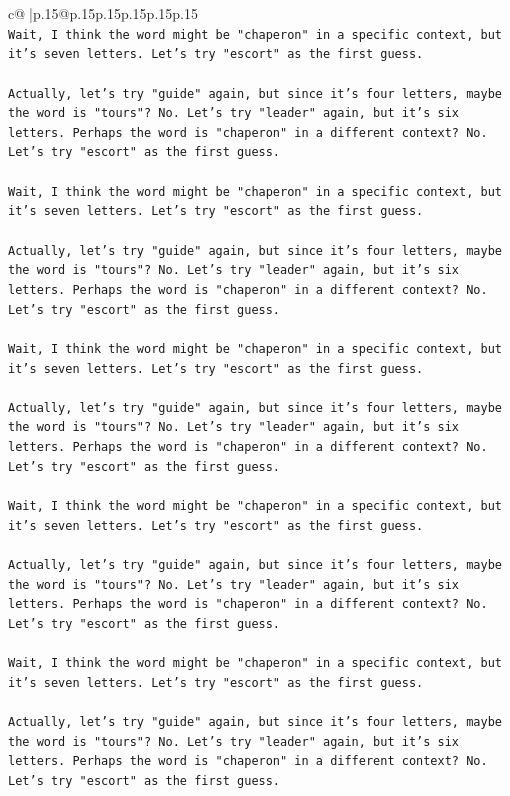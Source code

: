 \documentclass{article}
\begin{document}
{\begin{supertabular}{c@{$\;$}|p{.15\linewidth}@{}p{.15\linewidth}p{.15\linewidth}p{.15\linewidth}p{.15\linewidth}p{.15\linewidth}}
{{{\\ 
\texttt{Wait, I think the word might be "chaperon" in a specific context, but it's seven letters. Let's try "escort" as the first guess.} \\
\\ 
\texttt{Actually, let's try "guide" again, but since it's four letters, maybe the word is "tours"? No. Let's try "leader" again, but it's six letters. Perhaps the word is "chaperon" in a different context? No. Let's try "escort" as the first guess.} \\
\\ 
\texttt{Wait, I think the word might be "chaperon" in a specific context, but it's seven letters. Let's try "escort" as the first guess.} \\
\\ 
\texttt{Actually, let's try "guide" again, but since it's four letters, maybe the word is "tours"? No. Let's try "leader" again, but it's six letters. Perhaps the word is "chaperon" in a different context? No. Let's try "escort" as the first guess.} \\
\\ 
\texttt{Wait, I think the word might be "chaperon" in a specific context, but it's seven letters. Let's try "escort" as the first guess.} \\
\\ 
\texttt{Actually, let's try "guide" again, but since it's four letters, maybe the word is "tours"? No. Let's try "leader" again, but it's six letters. Perhaps the word is "chaperon" in a different context? No. Let's try "escort" as the first guess.} \\
\\ 
\texttt{Wait, I think the word might be "chaperon" in a specific context, but it's seven letters. Let's try "escort" as the first guess.} \\
\\ 
\texttt{Actually, let's try "guide" again, but since it's four letters, maybe the word is "tours"? No. Let's try "leader" again, but it's six letters. Perhaps the word is "chaperon" in a different context? No. Let's try "escort" as the first guess.} \\
\\ 
\texttt{Wait, I think the word might be "chaperon" in a specific context, but it's seven letters. Let's try "escort" as the first guess.} \\
\\ 
\texttt{Actually, let's try "guide" again, but since it's four letters, maybe the word is "tours"? No. Let's try "leader" again, but it's six letters. Perhaps the word is "chaperon" in a different context? No. Let's try "escort" as the first guess.} \\
}}}
\end{supertabular}}
\end{document}
